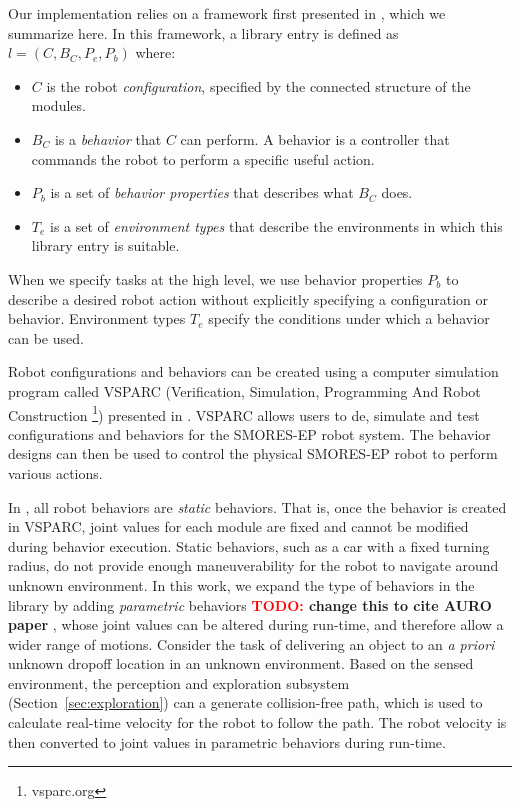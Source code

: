 \documentclass[journal]{IEEEtran}
\newcommand{\TODO}[1]{ {\bf \textcolor{red}{TODO:} #1 }}
\begin{document}
Our implementation relies on a framework first presented in \cite{Jing2016}, which we summarize here.
In this framework, a library entry is defined as $l = (C,B_C,P_e,P_b)$ where:
\begin{itemize}
\item $C$ is the robot \emph{configuration}, specified by the connected structure of the modules.
\item $B_C$ is a \emph{behavior} that $C$ can perform. A behavior is a controller that commands the robot to perform a specific useful action. 
\item $P_b$ is a set of \emph{behavior properties} that describes what $B_C$ does. 
\item $T_e$ is a set of \emph{environment types} that describe the environments in which this library entry is suitable. 
\end{itemize} 
%
When we specify tasks at the high level, we use behavior properties $P_b$ to describe a desired robot action without explicitly specifying a configuration or behavior.
Environment types $T_e$ specify the conditions under which a behavior can be used.

Robot configurations and behaviors can be created using a computer simulation program called VSPARC (Verification, Simulation, Programming And Robot Construction \footnote{vsparc.org}) presented in \cite{Jing2016}.
VSPARC allows users to de, simulate and test configurations and behaviors for the SMORES-EP robot system.
The behavior designs can then be used to control the physical SMORES-EP robot to perform various actions.

In \cite{Jing2016}, all robot behaviors are \textit{static} behaviors. That is, once the behavior is created in VSPARC, joint values for each module are fixed and cannot be modified during behavior execution.
Static behaviors, such as a car with a fixed turning radius, do not provide enough maneuverability for the robot to navigate around unknown environment.
In this work, we expand the type of behaviors in the library by adding \textit{parametric} behaviors \TODO{change this to cite AURO paper}, whose joint values can be altered during run-time, and therefore allow a wider range of motions.
Consider the task of delivering an object to an \textit{a priori} unknown dropoff location in an unknown environment.
Based on the sensed environment, the perception and exploration subsystem (Section~\ref{sec:exploration}) can a generate collision-free path, which is used to calculate real-time velocity for the robot to follow the path.
The robot velocity is then converted to joint values in parametric behaviors during run-time.
\end{document}
